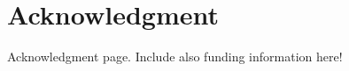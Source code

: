 \chapter*{Acknowledgment}
\vspace{5 mm}

%
Acknowledgment page. Include also funding information here!
%

